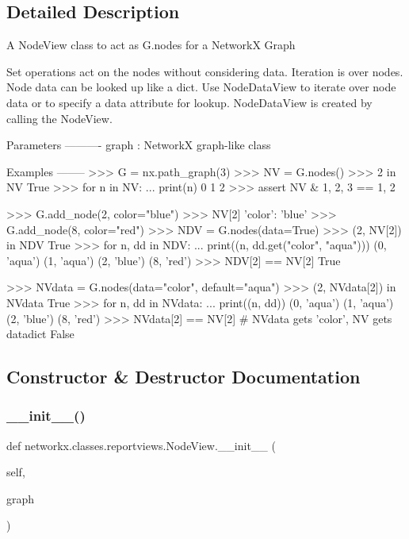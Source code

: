 \subsection{Detailed Description}
\begin{DoxyVerb}A NodeView class to act as G.nodes for a NetworkX Graph

Set operations act on the nodes without considering data.
Iteration is over nodes. Node data can be looked up like a dict.
Use NodeDataView to iterate over node data or to specify a data
attribute for lookup. NodeDataView is created by calling the NodeView.

Parameters
----------
graph : NetworkX graph-like class

Examples
--------
>>> G = nx.path_graph(3)
>>> NV = G.nodes()
>>> 2 in NV
True
>>> for n in NV:
...     print(n)
0
1
2
>>> assert NV & {1, 2, 3} == {1, 2}

>>> G.add_node(2, color="blue")
>>> NV[2]
{'color': 'blue'}
>>> G.add_node(8, color="red")
>>> NDV = G.nodes(data=True)
>>> (2, NV[2]) in NDV
True
>>> for n, dd in NDV:
...     print((n, dd.get("color", "aqua")))
(0, 'aqua')
(1, 'aqua')
(2, 'blue')
(8, 'red')
>>> NDV[2] == NV[2]
True

>>> NVdata = G.nodes(data="color", default="aqua")
>>> (2, NVdata[2]) in NVdata
True
>>> for n, dd in NVdata:
...     print((n, dd))
(0, 'aqua')
(1, 'aqua')
(2, 'blue')
(8, 'red')
>>> NVdata[2] == NV[2]  # NVdata gets 'color', NV gets datadict
False
\end{DoxyVerb}
 

\subsection{Constructor \& Destructor Documentation}
\mbox{\label{classnetworkx_1_1classes_1_1reportviews_1_1NodeView_a68e9b918ecfff9cf8dbf23668ba569e0}} 
\subsubsection{\texorpdfstring{\+\_\+\+\_\+init\+\_\+\+\_\+()}{\_\_init\_\_()}}
{\footnotesize\ttfamily def networkx.\+classes.\+reportviews.\+Node\+View.\+\_\+\+\_\+init\+\_\+\+\_\+ (\begin{DoxyParamCaption}\item[{}]{self,  }\item[{}]{graph }\end{DoxyParamCaption})}



